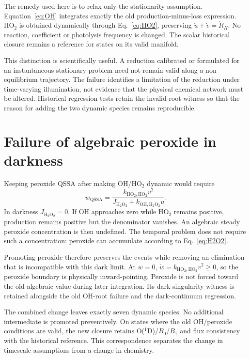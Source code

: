 The remedy used here is to relax only the stationarity assumption. Equation~\eqref{eq:OH} integrates exactly the old production-minus-loss expression. HO$_2$ is obtained dynamically through Eq.~\eqref{eq:HO2}, preserving $\dot u+\dot v=\dot R_H$. No reaction, coefficient or photolysis frequency is changed. The scalar historical closure remains a reference for states on its valid manifold.

This distinction is scientifically useful. A reduction calibrated or formulated for an instantaneous stationary problem need not remain valid along a non-equilibrium trajectory. The failure identifies a limitation of the reduction under time-varying illumination, not evidence that the physical chemical network must be altered. Historical regression tests retain the invalid-root witness so that the reason for adding the two dynamic species remains reproducible.

\section{Failure of algebraic peroxide in darkness}
Keeping peroxide QSSA after making OH/HO$_2$ dynamic would require
\begin{equation}w_{\mathrm{QSSA}}=
\frac{k_{\mathrm{HO_2,HO_2}}v^2}{J_{\mathrm{H_2O_2}}+k_{\mathrm{OH,H_2O_2}}u}.\label{eq:peroxideold}\end{equation}
In darkness $J_{\mathrm{H_2O_2}}=0$. If OH approaches zero while HO$_2$ remains positive, production remains positive but the denominator vanishes. An algebraic steady peroxide concentration is then undefined. The temporal problem does not require such a concentration: peroxide can accumulate according to Eq.~\eqref{eq:H2O2}.

Promoting peroxide therefore preserves the events while removing an elimination that is incompatible with this dark limit. At $w=0$, $\dot w=k_{\mathrm{HO_2,HO_2}}v^2\geq0$, so the peroxide boundary is physically inward-pointing. Peroxide is not forced toward the old algebraic value during later integration. Its dark-singularity witness is retained alongside the old OH-root failure and the dark-continuum regression.

The combined change leaves exactly seven dynamic species. No additional intermediate is promoted preventively. On states where the old OH/peroxide conditions are valid, the new closure retains O($^1$D)/$B_0$/$B_1$ and flux consistency with the historical reference. This correspondence separates the change in timescale assumptions from a change in chemistry.

